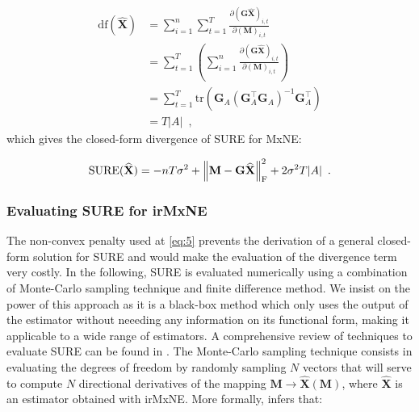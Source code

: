\begin{align*}
    \text{df}(\widehat{\mathbf{X}}) 
    &= \sum_{i=1}^n \sum_{t=1}^T
    \frac{
        \partial (\mathbf{G}\widehat{\mathbf{X}})_{i, t}
    }{
        \partial (\mathbf{M})_{i, t}
    } \\
    &= \sum_{t=1}^T \left(
        \sum_{i=1}^n \frac{
            \partial (\mathbf{G}\widehat{\mathbf{X}})_{i, t}
            }{
                \partial (\mathbf{M})_{i, t}
            } 
    \right) \\
    &= \sum_{t=1}^T \text{tr}(
        \mathbf{G}_A (\mathbf{G}_A^{\top}\mathbf{G}_A)^{-1}\mathbf{G}_A^{\top}
    ) \\
    &= T \lvert A \rvert
    \enspace ,
\end{align*}
%
which gives the closed-form divergence of SURE for MxNE:

\begin{equation} \label{eq:8}
    \text{SURE}(\widehat{\mathbf{X}})
    = -nT\sigma^2 + \left \lVert 
        \mathbf{M} - \mathbf{G}\widehat{\mathbf{X}}
     \right \rVert_{\text{F}}^2
    + 2 \sigma^2 T \lvert A \rvert
    \enspace .
\end{equation}

\subsubsection{Evaluating SURE for irMxNE}

The non-convex penalty used at \eqref{eq:5} prevents the derivation of a general closed-form solution for SURE and would make 
the evaluation of the divergence term very costly. In the following, 
SURE is evaluated numerically using a combination of Monte-Carlo sampling technique and finite difference method. 
We insist on the power of this approach as it is a black-box method which only uses the output of the estimator without neeeding
any information on its functional form, making it applicable to a wide range of estimators.
A comprehensive review of techniques to evaluate SURE can be found in \cite{Deledalle_Vaiter_Fadili_Peyre14}.
The Monte-Carlo sampling technique consists in evaluating the degrees of freedom by randomly sampling $N$ vectors that will 
serve to compute $N$ directional derivatives of the mapping $\mathbf{M} \rightarrow \widehat{\mathbf{X}}(\mathbf{M})$, where 
$\widehat{\mathbf{X}}$ is an estimator obtained with irMxNE. More formally, \cite{Deledalle_Vaiter_Fadili_Peyre14} infers that:

